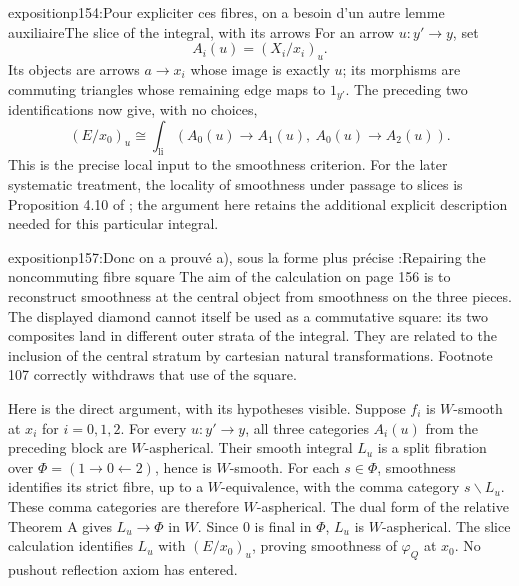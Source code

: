\begin{dcomment}{exposition}{p154:Pour expliciter ces fibres, on a besoin d'un autre lemme auxiliaire}{The slice of the integral, with its arrows}
For an arrow $u:y'\to y$, set
\[
 A_i(u)=(X_i/x_i)_u.
\]
Its objects are arrows $a\to x_i$ whose image is exactly $u$; its morphisms are commuting triangles whose remaining edge maps to $1_{y'}$. The preceding two identifications now give, with no choices,
\[
       (E/x_0)_u\cong\int_{\mathrm{li}}
          (A_0(u)\longrightarrow A_1(u),\ A_0(u)\longrightarrow A_2(u)).
\]
This is the precise local input to the smoothness criterion. For the later systematic treatment, the locality of smoothness under passage to slices is Proposition 4.10 of \citet{Maltsiniotis2005Asphericite}; the argument here retains the additional explicit description needed for this particular integral.
\end{dcomment}

\begin{dcomment}{exposition}{p157:Donc on a prouvé a), sous la forme plus précise :}{Repairing the noncommuting fibre square}
The aim of the calculation on page 156 is to reconstruct smoothness at the central object from smoothness on the three pieces. The displayed diamond cannot itself be used as a commutative square: its two composites land in different outer strata of the integral. They are related to the inclusion of the central stratum by cartesian natural transformations. Footnote 107 correctly withdraws that use of the square.

Here is the direct argument, with its hypotheses visible. Suppose $f_i$ is $W$-smooth at $x_i$ for $i=0,1,2$. For every $u:y'\to y$, all three categories $A_i(u)$ from the preceding block are $W$-aspherical. Their smooth integral $L_u$ is a split fibration over $\Phi=(1\to0\leftarrow2)$, hence is $W$-smooth. For each $s\in\Phi$, smoothness identifies its strict fibre, up to a $W$-equivalence, with the comma category $s\backslash L_u$. These comma categories are therefore $W$-aspherical. The dual form of the relative Theorem A gives $L_u\to\Phi$ in $W$. Since $0$ is final in $\Phi$, $L_u$ is $W$-aspherical. The slice calculation identifies $L_u$ with $(E/x_0)_u$, proving smoothness of $\varphi_Q$ at $x_0$. No pushout reflection axiom has entered.


\end{dcomment}
